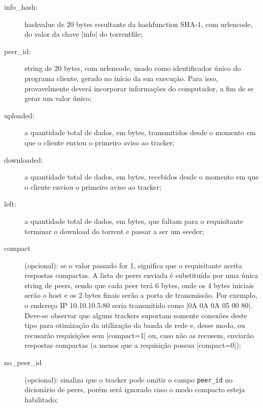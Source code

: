\begin{description}
    \item[info\_hash:] \gls*{hashvalue} de 20 bytes resultante da \gls*{hashfunction}
        SHA-1, com \gls*{urlencode}, do valor da chave \bverb|info| do
        \gls*{torrentfile};

    \item[peer\_id:] \gls*{string} de 20 bytes, com \gls*{urlencode}, usado como
        identificador único do programa cliente, gerado no ínício da sua execução. Para
        isso, provavelmente deverá incorporar informações do computador, a fim de se
        gerar um valor único;

    \item[uploaded:] a quantidade total de dados, em bytes, transmitidos desde o
        momento em que o cliente enviou o primeiro aviso ao \gls*{tracker};

    \item[downloaded:] a quantidade total de dados, em bytes, recebidos desde o momento
        em que o cliente enviou o primeiro aviso ao \gls*{tracker};

    \item[left:] a quantidade total de dados, em bytes, que faltam para o requisitante
        terminar o download do \gls*{torrent} e passar a ser um \gls*{seeder};

    \item[compact] (opcional): \label{par:compact} se o valor passado for 1, significa
        que o requisitante aceita respostas compactas. A lista de \glspl*{peer} enviada
        é substituída por uma única \gls*{string} de \glspl*{peer}, sendo que cada
        \gls*{peer} terá 6 bytes, onde os 4 bytes iniciais serão o host e os 2 bytes
        finais serão a porta de transmissão. Por exemplo, o endereço IP 10.10.10.5:80
        seria transmitido como \bverb|0A 0A 0A 05 00 80|. Deve-se observar que alguns
        \glspl*{tracker} suportam somente conexões deste tipo para otimização da
        utilização da banda de rede e, desse modo, ou recusarão requisições sem
        \bverb|compact=1| ou, caso não as recusem, enviarão respostas compactas (a
        menos que a requisição possua \bverb|compact=0|);

    \item[no\_peer\_id] (opcional): sinaliza que o \gls*{tracker} pode omitir o
        campo \textcolor{Bittersweet}{\texttt{peer\_id}} no dicionário de \glspl*{peer},
        porém será ignorado caso o modo compacto esteja habilitado;


\end{description}

